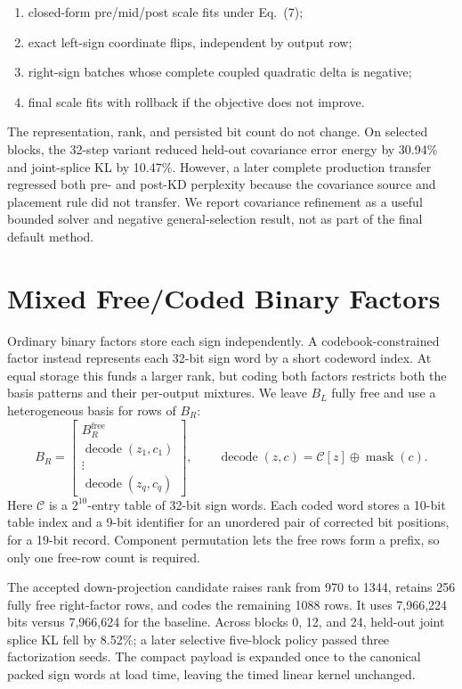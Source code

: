 \documentclass[10pt]{article}
\begin{document}
\begin{enumerate}
  \item closed-form pre/mid/post scale fits under Eq.~(7);
  \item exact left-sign coordinate flips, independent by output row;
  \item right-sign batches whose complete coupled quadratic delta is negative;
  \item final scale fits with rollback if the objective does not improve.
\end{enumerate}

The representation, rank, and persisted bit count do not change. On selected
blocks, the 32-step variant reduced held-out covariance error energy by 30.94\%
and joint-splice KL by 10.47\%. However, a later complete production transfer
regressed both pre- and post-KD perplexity because the covariance source and
placement rule did not transfer. We report covariance refinement as a useful
bounded solver and negative general-selection result, not as part of the final
default method.

\section{Mixed Free/Coded Binary Factors}
\label{sec:mixed}

Ordinary binary factors store each sign independently. A codebook-constrained
factor instead represents each 32-bit sign word by a short codeword index. At
equal storage this funds a larger rank, but coding both factors restricts both
the basis patterns and their per-output mixtures. We leave $B_L$ fully free
and use a heterogeneous basis for rows of $B_R$:
\[
 B_R=\begin{bmatrix}B_R^{\mathrm{free}}\\
 \operatorname{decode}(z_1,c_1)\\ \vdots\\
 \operatorname{decode}(z_q,c_q)
 \end{bmatrix},
 \qquad
 \operatorname{decode}(z,c)=\mathcal C[z]\oplus \operatorname{mask}(c).
 \tag{8}
\]
Here $\mathcal C$ is a $2^{10}$-entry table of 32-bit sign words. Each coded
word stores a 10-bit table index and a 9-bit identifier for an unordered pair
of corrected bit positions, for a 19-bit record. Component permutation lets
the free rows form a prefix, so only one free-row count is required.

The accepted down-projection candidate raises rank from 970 to 1344, retains
256 fully free right-factor rows, and codes the remaining 1088 rows. It uses
7,966,224 bits versus 7,966,624 for the baseline. Across blocks 0, 12, and 24,
held-out joint splice KL fell by 8.52\%; a later selective five-block policy
passed three factorization seeds. The compact payload is expanded once to the
canonical packed sign words at load time, leaving the timed linear kernel
unchanged.
\end{document}
